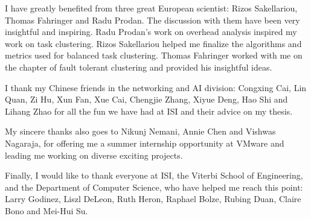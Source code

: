 I have greatly benefited from three great European scientist: Rizos Sakellariou, Thomas Fahringer and Radu Prodan. The discussion with them have been very insightful and inspiring. Radu Prodan's work on overhead analysis inspired my work on task clustering. Rizos Sakellariou helped me finalize the algorithms and metrics used for balanced task clustering. Thomas Fahringer worked with me on the chapter of fault tolerant clustering and provided his insightful ideas. 

I thank my Chinese friends in the networking and AI division: Congxing Cai, Lin Quan, Zi Hu, Xun Fan, Xue Cai, Chengjie Zhang, Xiyue Deng, Hao Shi and Lihang Zhao for all the fun we have had at ISI and their advice on my thesis. 

My sincere thanks also goes to Nikunj Nemani, Annie Chen and Vishwas Nagaraja, for offering me a summer internship opportunity at VMware and leading me working on diverse exciting projects. 


Finally, I would like to thank everyone at ISI, the Viterbi School of Engineering, and the Department of Computer Science, who have helped me reach this point: Larry Godinez, Liszl DeLeon, Ruth Heron, Raphael Bolze, Rubing Duan, Claire Bono and Mei-Hui Su. 

